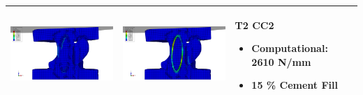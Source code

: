 \documentclass[11pt,a4paper]{article}
\begin{document}
\begin{landscape}
\begin{longtable}{|m{11cm}|m{11cm}|m{4cm}|}
\includegraphics[width=10cm]{images/T2_CC2_intact_MM_cement_Large_Middle_ABAQUS_Stress.png}   & \includegraphics[width=10cm]{images/T2_CC2_intact_MM_cement_Large_Middle_ABAQUS_Strain.png}   & T2 CC2 \begin{itemize} \item  Computational:	2610  N/mm \item 15 \% Cement Fill \end{itemize} \\ \hline 
\end{longtable}

\end{landscape}
\end{document}
